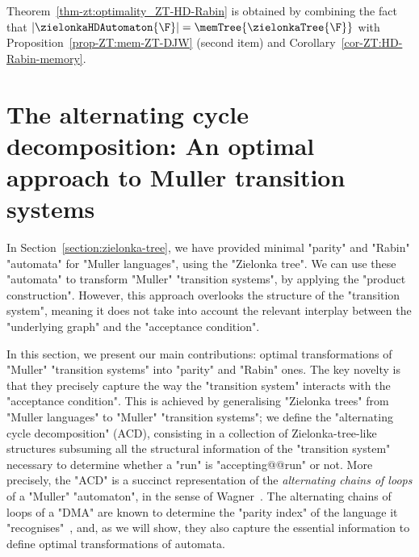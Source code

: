 \documentclass[10pt,a4paper]{amsart}
\begin{document}
Theorem~\ref{thm-zt:optimality_ZT-HD-Rabin} is obtained by combining the fact that $|\zielonkaHDAutomaton{\F}| = \memTree{\zielonkaTree{\F}}$ with Proposition~\ref{prop-ZT:mem-ZT-DJW} (second item) and Corollary~\ref{cor-ZT:HD-Rabin-memory}.



 	
	
	\section{The alternating cycle decomposition: An optimal approach to Muller transition systems}\label{section:acd}

In Section~\ref{section:zielonka-tree}, we have provided minimal "parity" and "Rabin" "automata" for "Muller languages", using the "Zielonka tree".
We can use these "automata" to transform "Muller" "transition systems", by applying the "product construction".
However, this approach overlooks the structure of the "transition system", meaning it does not take into account the relevant interplay between the "underlying graph" and the "acceptance condition".

In this section, we present our main contributions: optimal transformations of "Muller" "transition systems" into "parity" and "Rabin" ones.
The key novelty is that they precisely capture the way the "transition system" interacts with the "acceptance condition".
This is achieved by generalising "Zielonka trees" from "Muller languages" to "Muller" "transition systems"; we define the "alternating cycle decomposition" (ACD), consisting in a collection of Zielonka-tree-like structures subsuming all the structural information of the "transition system" necessary to determine whether a "run" is "accepting@@run" or not.
More precisely, the "ACD" is a succinct representation of the \emph{alternating chains of loops} of a "Muller" "automaton", in the sense of Wagner~\cite{Wagner1979omega}. The alternating chains of loops of a "DMA" are known to determine the "parity index" of the language it "recognises"~\cite{Wagner1979omega}, and, as we will show, they also capture the essential information to define optimal transformations of automata.
\end{document}
